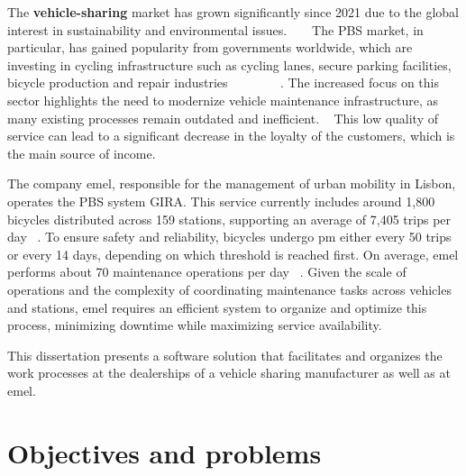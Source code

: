The \textbf{vehicle-sharing} market has grown significantly since 2021 due to the global interest in sustainability and environmental issues. ~\cite{cohesionOpenData} ~\cite{bike_data_businessresearch}
The \acs{PBS} market, in particular, has gained popularity from governments worldwide, which are investing in cycling infrastructure such as cycling lanes, secure parking facilities, bicycle production and repair industries ~\cite{Clercq2023} ~\cite{Cerro2024} ~\cite{European_declararion_on_cycling} ~\cite{bike_data_businessresearch} ~\cite{cohesionOpenData}.
The increased focus on this sector highlights the need to modernize vehicle maintenance infrastructure, as many existing processes remain outdated and inefficient. ~\cite{MAS_MOTORS}
This low quality of service can lead to a significant decrease in the loyalty of the customers, which is the main source of income. ~\cite{Setting_the_after_sale_process}


The company \ac{emel}, responsible for the management of urban mobility in Lisbon, operates the \acs{PBS} system GIRA. This service currently includes around 1,800 bicycles distributed across 159 stations, supporting an average of 7,405 trips per day ~\cite{Gira_Trips}. To ensure safety and reliability, bicycles undergo \acs{pm} either every 50 trips or every 14 days, depending on which threshold is reached first. On average, \ac{emel} performs about 70 maintenance operations per day ~\cite{Gira_Maintenance}. Given the scale of operations and the complexity of coordinating maintenance tasks across vehicles and stations, \ac{emel} requires an efficient system to organize and optimize this process, minimizing downtime while maximizing service availability.

This dissertation presents a software solution that facilitates and organizes the work processes at the dealerships of a vehicle sharing manufacturer as well as at \ac{emel}. 


\section{Objectives and problems}

